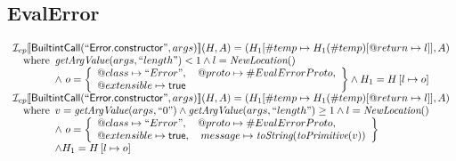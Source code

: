 \subsection{EvalError}
\[
\begin{array}{l}
\mathcal{I} _{cp}\llbracket \mbox{\textsf{BuiltintCall}}(``\mbox{\textsf{Error.constructor}}",args)\rrbracket(H,A)
  = (H_1[\#temp \mapsto H_1(\#temp)[@return \mapsto l]], A)\\
\quad{\rm where}\begin{array}[t]{l}
  \emph{getArgValue}(args, ``length") < 1 
  \land l=\emph{NewLocation}()\\
  \land\ o = \left\{\begin{array}{l}
    @class\mapsto ``Error", \quad
    @proto\mapsto \#EvalErrorProto,\\
    @extensible\mapsto \mbox{\textsf{true}}
    \end{array}\right\}
  \land H_1=H\left[l\mapsto o\right]\\
  \end{array}\\
  
\mathcal{I} _{cp}\llbracket \mbox{\textsf{BuiltintCall}}(``\mbox{\textsf{Error.constructor}}",args)\rrbracket(H,A)
  = (H_1[\#temp \mapsto H_1(\#temp)[@return \mapsto l]], A)\\
\quad{\rm where}\begin{array}[t]{l}
  v = \emph{getArgValue}(args, ``0") \land \emph{getArgValue}(args, ``length") \geq 1
  \land l=\emph{NewLocation}()\\
  \land\ o = \left\{\begin{array}{l}
    @class\mapsto ``Error", \quad
    @proto\mapsto \#EvalErrorProto,\\
    @extensible\mapsto \mbox{\textsf{true}},  \quad
    message \mapsto \emph{toString}(\emph{toPrimitive}(v)) 
    \end{array}\right\}\\
  \land H_1=H\left[l\mapsto o\right]
  \end{array}\\

\end{array}
\]


